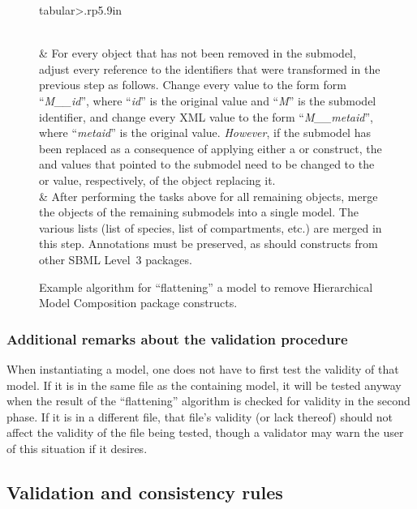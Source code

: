 \begin{figure}[thb]
\begin{edtable}{tabular}{>{\therownum.}rp{5.9in}}
\begin{enumerate}[label={\alph*})]
    \vspace*{-1em}
    \end{enumerate}
    \\[2pt]
    & For every object that has not been removed in the submodel,
    adjust every reference to the identifiers that were transformed in
    the previous step as follows.  Change every  value
    to the form form ``\emph{M\_\_id}'', where ``\emph{id}'' is the
    original  value and ``\emph{M}'' is the submodel
    identifier, and change every XML  value to the form
    ``\emph{M\_\_metaid}'', where ``\emph{metaid}'' is the original
     value.  \emph{However}, if the submodel has been
    replaced as a consequence of applying either a \ReplacedElement or
    \ReplacedBy construct, the  and 
    values that pointed to the submodel need to be changed to the
     or  value, respectively, of the object
    replacing it.
    \\[2pt]
    & After performing the tasks above for all remaining objects,
    merge the objects of the remaining submodels into a single model.
    The various lists (list of species, list of compartments, etc.) are
    merged in this step.  Annotations must be preserved, as should
    constructs from other SBML Level~3 packages.
    \\
    \bottomrule
  \end{edtable}
  \caption{Example algorithm for ``flattening'' a model to remove
    Hierarchical Model Composition package constructs.}
  \label{flattening-algo}
\end{figure}


\subsubsection{Additional remarks about the validation procedure}

When \notice instantiating a model, one does not have to first test the
validity of that model.  If it is in the same file as the containing
model, it will be tested anyway when the result of the ``flattening''
algorithm is checked for validity in the second phase.  If it is in a
different file, that file's validity (or lack thereof) should not affect
the validity of the file being tested, though a validator may warn the
user of this situation if it desires.


\subsection{Validation and consistency rules}
\label{validation-rules}

